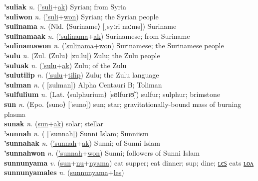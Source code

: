 \textbf{'suliak} \textit{n.} (\hyperref['suli]{'suli}+\hyperref[ak]{ak})
Syrian; from Syria \label{'suliak} \\
\textbf{'suliwon} \textit{n.} (\hyperref['suli]{'suli}+\hyperref[won]{won})
Syrian; the Syrian people \label{'suliwon} \\
\textbf{'sulinama} \textit{n.} (Nld. ⟨Suriname⟩ [ˌsyːriˈnaːmə])
Suriname \label{'sulinama} \\
\textbf{'sulinamaak} \textit{n.} (\hyperref['sulinama]{'sulinama}+\hyperref[ak]{ak})
Surinamese; from Suriname \label{'sulinamaak} \\
\textbf{'sulinamawon} \textit{n.} (\hyperref['sulinama]{'sulinama}+\hyperref[won]{won})
Surinamese; the Surinamese people \label{'sulinamawon} \\
\textbf{'sulu} \textit{n.} (Zul. ⟨Zulu⟩ [zuːlu])
Zulu; the Zulu people \label{'sulu} \\
\textbf{'suluak} \textit{n.} (\hyperref['sulu]{'sulu}+\hyperref[ak]{ak})
Zulu; of the Zulu \label{'suluak} \\
\textbf{'sulutilip} \textit{n.} (\hyperref['sulu]{'sulu}+\hyperref[tilip]{tilip})
Zulu; the Zulu language \label{'sulutilip} \\
\textbf{'sulman} \textit{n.} ( [zulman])
Alpha Centauri B; Toliman \label{'sulman} \\
\textbf{'sulfulium} \textit{n.} (Lat. ⟨sulphurium⟩ [sʊlfurɪʊ̃])
sulfur; sulphur; brimstone \label{'sulfulium} \\
\textbf{sun} \textit{n.} (Epo. ⟨suno⟩ [ˈsuno])
sun; star; gravitationally-bound mass of burning plasma \label{sun} \\
\textbf{sunak} \textit{n.} (\hyperref[sun]{sun}+\hyperref[ak]{ak})
solar; stellar \label{sunak} \\
\textbf{'sunnah} \textit{n.} ( [ˈsunnah])
Sunni Islam; Sunniism \label{'sunnah} \\
\textbf{'sunnahak} \textit{n.} (\hyperref['sunnah]{'sunnah}+\hyperref[ak]{ak})
Sunni; of Sunni Islam \label{'sunnahak} \\
\textbf{'sunnahwon} \textit{n.} (\hyperref['sunnah]{'sunnah}+\hyperref[won]{won})
Sunni; followers of Sunni Islam \label{'sunnahwon} \\
\textbf{sunnunyama} \textit{v.} (\hyperref[sun]{sun}+\hyperref[nu]{nu}+\hyperref[nyama]{nyama})
eat supper; eat dinner; sup; dine; \hyperref[sunnunyamales]{ʟєꜱ} eats \hyperref[sunnunyamalon]{ʟᴏᴧ} \label{sunnunyama} \\
\textbf{sunnunyamales} \textit{n.} (\hyperref[sunnunyama]{sunnunyama}+\hyperref[les]{les})
